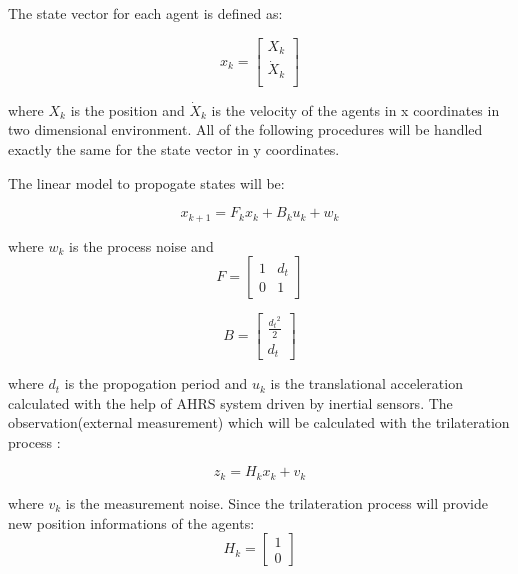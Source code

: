The state vector for each agent is defined as:

\begin{equation}
x_k = \begin{bmatrix}
X_k \\
\dot{X}_k\\
\end{bmatrix}
\end{equation}
	
where $X_k$ is the position and $\dot{X}_k$ is the velocity of the agents in x coordinates in two dimensional environment. All of the following procedures will be handled exactly the same for the state vector in y coordinates.

The linear model to propogate states will be:

\begin{equation}
x_{k+1} = F_k     x_{k} + B_ku_k + w_k
\end{equation}
	
where $w_k$ is the process noise and 
\begin{equation}
F = \begin{bmatrix}
1 & d_t\\
0 & 1
\end{bmatrix}   
\end{equation}
	
\begin{equation}
B = \begin{bmatrix}
\frac{{d_t}^2}{2} \\
d_t
\end{bmatrix}
\end{equation}

where $d_t$ is the propogation period and $u_k$ is the translational acceleration calculated with the help of AHRS system driven by inertial sensors. The observation(external measurement) which will be calculated with the trilateration process :

\begin{equation}
z_k = H_kx_k + v_k
\end{equation}

where $v_k$ is the measurement noise. Since the trilateration process will provide new position informations of the agents:
\begin{equation}
H_k = \begin{bmatrix}
1\\0
\end{bmatrix}
\end{equation}
	

